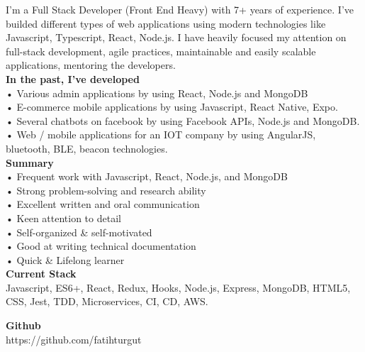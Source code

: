 

\begin{cvparagraph}

I'm a Full Stack Developer (Front End Heavy) with 7+ years of experience. I've builded different types of web applications using modern technologies like Javascript, Typescript, React, Node.js. I have heavily focused my attention on full-stack development, agile practices, maintainable and easily scalable applications, mentoring the developers. \\

\textbf {In the past, I've developed} \\
• Various admin applications by using React, Node.js and MongoDB \\
• E-commerce mobile applications by using Javascript, React Native, Expo. \\
• Several chatbots on facebook by using Facebook APIs, Node.js and MongoDB. \\
• Web / mobile applications for an IOT company by using AngularJS, bluetooth, BLE, beacon technologies. \\

\textbf {Summary} \\
• Frequent work with Javascript, React, Node.js, and MongoDB \\
• Strong problem-solving and research ability \\
• Excellent written and oral communication \\
• Keen attention to detail \\
• Self-organized {\&} self-motivated \\
• Good at writing technical documentation \\
• Quick {\&} Lifelong learner \\


\textbf {Current Stack} \\
Javascript, ES6+, React, Redux, Hooks, Node.js, Express, MongoDB, HTML5, CSS, Jest, TDD, Microservices, CI, CD, AWS.

\textbf {Github} \\
https://github.com/fatihturgut

\end{cvparagraph}
